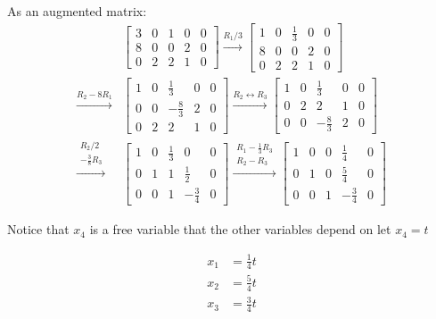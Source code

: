 \documentclass{article}
\begin{document}
As an augmented matrix:
\begin{align*}
&\left[ 
    \begin{array}{cccc|c}
    3 & 0 & 1 & 0 & 0\\
    8 & 0 & 0 & 2 & 0\\
    0 & 2 & 2 & 1 & 0
    \end{array}
\right]
\xrightarrow{R_1/3}
\left[ 
    \begin{array}{cccc|c}
    1 & 0 & \frac{1}{3} & 0 & 0\\
    8 & 0 & 0 & 2 & 0\\
    0 & 2 & 2 & 1 & 0
    \end{array}
\right] \\
\xrightarrow{R_2 - 8R_1}
&\left[ 
    \begin{array}{cccc|c}
    1 & 0 & \frac{1}{3} & 0 & 0\\
    0 & 0 & -\frac{8}{3} & 2 & 0\\
    0 & 2 & 2 & 1 & 0
    \end{array}
\right]
\xrightarrow{R_2 \leftrightarrow R_3}
\left[ 
    \begin{array}{cccc|c}
    1 & 0 & \frac{1}{3} & 0 & 0\\
    0 & 2 & 2 & 1 & 0\\
    0 & 0 & -\frac{8}{3} & 2 & 0
    \end{array}
\right] \\
\xrightarrow{\substack{R_{2}/2 \\ -\frac{3}{8}R_{3}}}
&\left[ 
    \begin{array}{cccc|c}
    1 & 0 & \frac{1}{3} & 0 & 0\\
    0 & 1 & 1 & \frac{1}{2} & 0\\
    0 & 0 & 1 & -\frac{3}{4} & 0
    \end{array}
\right] 
\xrightarrow{\substack{R_{1} - \frac{1}{3}R_3 \\ R_2 - R_3}}
\left[ 
    \begin{array}{cccc|c}
    1 & 0 & 0 & \frac{1}{4} & 0 \\
    0 & 1 & 0 & \frac{5}{4} & 0 \\
    0 & 0 & 1 & -\frac{3}{4} & 0
    \end{array}
\right] 
\end{align*}

Notice that $x_4$ is a free variable that the other variables depend on let $x_4 = t$

\begin{align*}
    x_1 &= \frac{1}{4}t \\
    x_2 &= \frac{5}{4}t \\
    x_3 &= \frac{3}{4}t
\end{align*}
\end{document}
